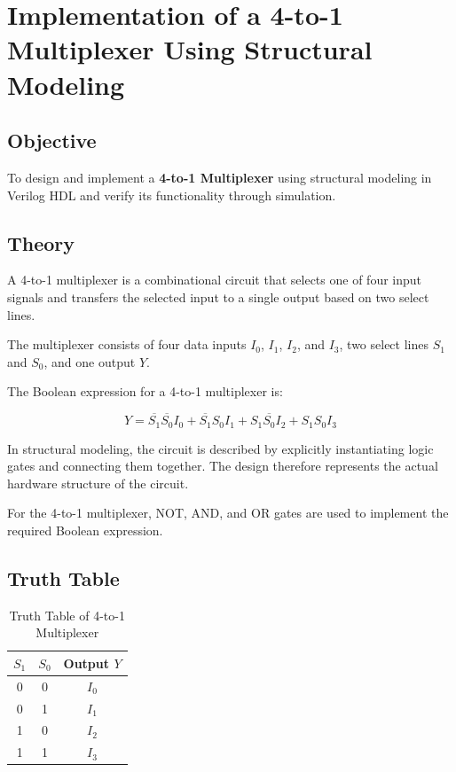 \documentclass[12pt,a4paper]{report}
\begin{document}
\vspace{2.5cm}
\chapter{Implementation of a 4-to-1 Multiplexer Using Structural Modeling}
\label{ch:pdf12}

\section{Objective}

To design and implement a \textbf{4-to-1 Multiplexer} using structural modeling in Verilog HDL and verify its functionality through simulation.

\section{Theory}

A 4-to-1 multiplexer is a combinational circuit that selects one of four input signals and transfers the selected input to a single output based on two select lines.

The multiplexer consists of four data inputs $I_0$, $I_1$, $I_2$, and $I_3$, two select lines $S_1$ and $S_0$, and one output $Y$.

The Boolean expression for a 4-to-1 multiplexer is:

\[
Y =
\overline{S_1}\overline{S_0}I_0
+
\overline{S_1}S_0I_1
+
S_1\overline{S_0}I_2
+
S_1S_0I_3
\]

In structural modeling, the circuit is described by explicitly instantiating logic gates and connecting them together. The design therefore represents the actual hardware structure of the circuit.

For the 4-to-1 multiplexer, NOT, AND, and OR gates are used to implement the required Boolean expression.

\section{Truth Table}

\begin{table}[H]
    \centering
    \caption{Truth Table of 4-to-1 Multiplexer}
    \label{tab:mux4_structural}
    \begin{tabular}{|c|c|c|}
    \hline
    \textbf{$S_1$} & \textbf{$S_0$} & \textbf{Output $Y$} \\
    \hline
    0 & 0 & $I_0$ \\
    \hline
    0 & 1 & $I_1$ \\
    \hline
    1 & 0 & $I_2$ \\
    \hline
    1 & 1 & $I_3$ \\
    \hline
    \end{tabular}
\end{table}
\end{document}
